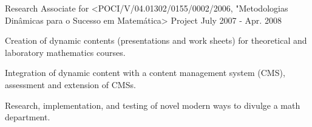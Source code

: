 \begin{cventries}
  \cventry    
    {Research Associate for <POCI/V/04.01302/0155/0002/2006, "Metodologias Din\^amicas para o Sucesso em Matem\'atica> Project} %
    {} %
    {} %
    {July 2007 - Apr. 2008} %
    {
      \begin{cvitems} %
        \item {Creation of dynamic contents (presentations and work sheets) for theoretical and laboratory mathematics courses.}
        \item {Integration of dynamic content with a content management system (CMS), assessment and extension of CMSs.}
		\item {Research, implementation, and testing of novel modern ways to divulge a math department.}
      \end{cvitems}
    }  
     
\end{cventries}
